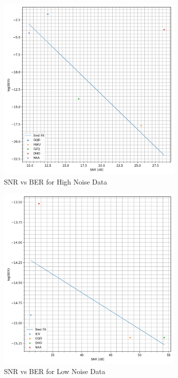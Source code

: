 \begin{figure}[h!]
    \begin{subfigure}[b]{0.5\textwidth}
    \centering
    \includegraphics[width = \textwidth]{figs/sim/symRecovery/snrvber_real.png}
    \caption{SNR vs BER for High Noise Data}
    \label{fig:snrwins}
    \end{subfigure}
    \begin{subfigure}[b]{0.5\textwidth}
    \centering
    \includegraphics[width = \textwidth]{figs/sim/symRecovery/snrvber_real_charmy.png}
    \caption{SNR vs BER for Low Noise Data}
    \label{snr:charmy}
    \end{subfigure}
    \caption{}
\end{figure}
\pagebreak
